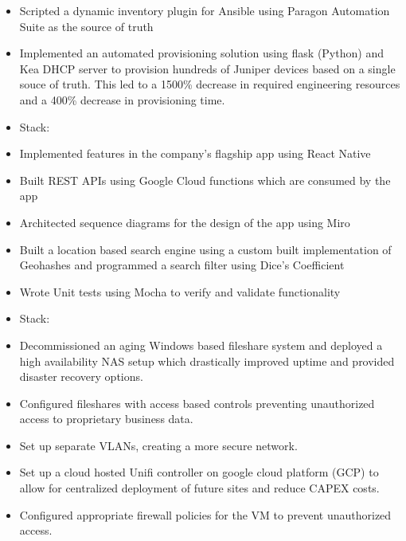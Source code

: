     

\begin{itemize}
    \item Scripted a dynamic inventory plugin for Ansible using Paragon Automation Suite as the source of truth
    \item Implemented an automated provisioning solution using flask (Python) and Kea DHCP server to provision hundreds of Juniper devices based on a single souce of truth. This led to a 1500\% decrease in required engineering resources and a 400\% decrease in provisioning time.
    \item Stack:   
\end{itemize}

\divider

\begin{itemize}
    \item Implemented features in the company's flagship app using React Native
    \item Built REST APIs using Google Cloud functions which are consumed by the app
    \item Architected sequence diagrams for the design of the app using Miro
    \item Built a location based search engine using a custom built implementation of Geohashes and programmed a search filter using Dice's Coefficient
    \item Wrote Unit tests using Mocha to verify and validate functionality
    \item Stack:      
\end{itemize}
\divider

\begin{itemize}
    \item Decommissioned an aging Windows based fileshare system and deployed a high availability NAS setup which drastically improved uptime and provided disaster recovery options.
    \item Configured fileshares with access based controls preventing unauthorized access to proprietary business data.
    \item Set up separate VLANs, creating a more secure network.
    \item Set up a cloud hosted Unifi controller on google cloud platform (GCP) to allow for centralized deployment of future sites and reduce CAPEX costs.
    \item Configured appropriate firewall policies for the VM to prevent unauthorized access.
\end{itemize}
\divider


